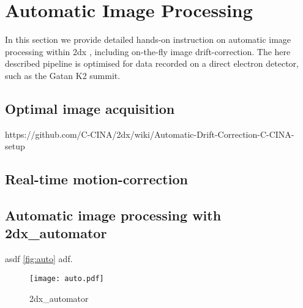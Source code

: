 \section{Automatic Image Processing}

In this section we provide detailed hands-on instruction on automatic image processing within 2dx \cite{scherer20142dx_automator}, including on-the-fly image drift-correction. The here described pipeline is optimised for data recorded on a direct electron detector, such as the Gatan K2 summit. 

\subsection{Optimal image acquisition}

https://github.com/C-CINA/2dx/wiki/Automatic-Drift-Correction-C-CINA-setup

\subsection{Real-time motion-correction}

\subsection{Automatic image processing with 2dx\_automator}

asdf  \autoref{fig:auto} adf.

\begin{figure}
	\centering
	\texttt{[image: auto.pdf]}
	\caption{2dx\_automator}
	\label{fig:auto}
\end{figure}
